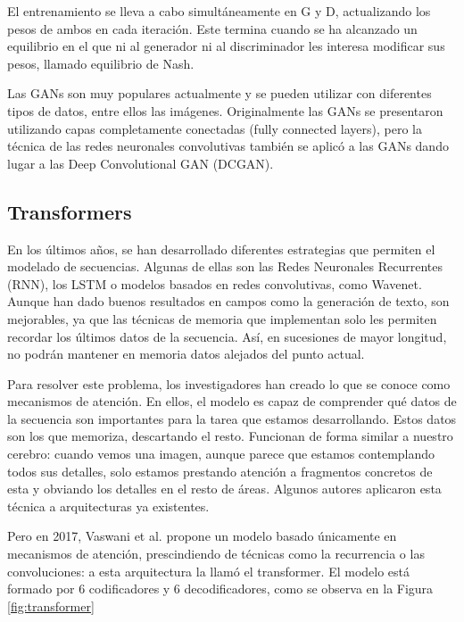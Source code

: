 El entrenamiento se lleva a cabo simultáneamente en G y D, actualizando los pesos de ambos en cada iteración. Este termina cuando se ha alcanzado un equilibrio en el que ni al generador ni al discriminador les interesa modificar sus pesos, llamado equilibrio de Nash.

Las GANs son muy populares actualmente y se pueden utilizar con diferentes tipos de datos, entre ellos las imágenes. Originalmente las GANs se presentaron utilizando capas completamente conectadas (fully connected layers), pero la técnica de las redes neuronales convolutivas también se aplicó a las GANs dando lugar a las Deep Convolutional GAN (DCGAN). \cite{berzal2018redes}

\subsection{Transformers}
En los últimos años, se han desarrollado diferentes estrategias que permiten el modelado de secuencias. Algunas de ellas son las Redes Neuronales Recurrentes (RNN), los LSTM o modelos basados en redes convolutivas, como Wavenet. Aunque han dado buenos resultados en campos como la generación de texto, son mejorables, ya que las técnicas de memoria que implementan solo les permiten recordar los últimos datos de la secuencia. Así, en sucesiones de mayor longitud, no podrán mantener en memoria datos alejados del punto actual.

Para resolver este problema, los investigadores han creado lo que se conoce como mecanismos de atención. En ellos, el modelo es capaz de comprender qué datos de la secuencia son importantes para la tarea que estamos desarrollando. Estos datos son los que memoriza, descartando el resto. Funcionan de forma similar a nuestro cerebro: cuando vemos una imagen, aunque parece que estamos contemplando todos sus detalles, solo estamos prestando atención a fragmentos concretos de esta y obviando los detalles en el resto de áreas. Algunos autores aplicaron esta técnica a arquitecturas ya existentes. 

Pero en 2017, Vaswani et al. \cite{vaswani2017attention} propone un modelo basado únicamente en mecanismos de atención, prescindiendo de técnicas como la recurrencia o las convoluciones: a esta arquitectura la llamó el transformer. El modelo está formado por 6 codificadores y 6 decodificadores, como se observa en la Figura \ref{fig:transformer}

